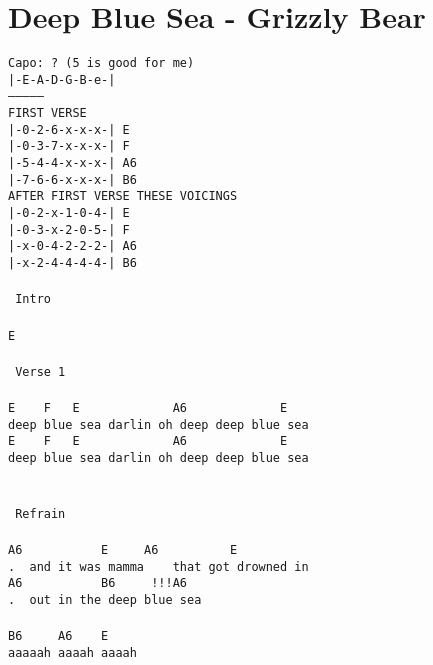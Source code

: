 \newpage
\section{Deep Blue Sea - Grizzly Bear}
\label{Deep Blue Sea - Grizzly Bear}
\texttt{Capo: ? (5 is good for me)\\
|-E-A-D-G-B-e-|\\
---------------\\
FIRST VERSE\\
|-0-2-6-x-x-x-|\ E\\
|-0-3-7-x-x-x-|\ F\\
|-5-4-4-x-x-x-|\ A6\\
|-7-6-6-x-x-x-|\ B6\\
AFTER FIRST VERSE THESE VOICINGS\\
|-0-2-x-1-0-4-|\ E\\
|-0-3-x-2-0-5-|\ F\\
|-x-0-4-2-2-2-|\ A6\\
|-x-2-4-4-4-4-|\ B6\\
\\
\lbrack\ Intro\rbrack\\
\\
E\\
\\
\lbrack\ Verse\ 1\rbrack\\
\\
E\ \ \ \ F\ \ \ E\ \ \ \ \ \ \ \ \ \ \ \ \ A6\ \ \ \ \ \ \ \ \ \ \ \ \ E\\
deep\ blue\ sea\ darlin\ oh\ deep\ deep\ blue\ sea\\
E\ \ \ \ F\ \ \ E\ \ \ \ \ \ \ \ \ \ \ \ \ A6\ \ \ \ \ \ \ \ \ \ \ \ \ E\\
deep\ blue\ sea\ darlin\ oh\ deep\ deep\ blue\ sea\\
\\
\\
\lbrack\ Refrain\rbrack\\
\\
A6\ \ \ \ \ \ \ \ \ \ \ E\ \ \ \ \ A6\ \ \ \ \ \ \ \ \ \ E\\
.\ \ and\ it\ was\ mamma\ \ \ \ that\ got\ drowned\ in\\
A6\ \ \ \ \ \ \ \ \ \ \ B6\ \ \ \ \ !!!A6\\
.\ \ out\ in\ the\ deep\ blue\ sea\\
\\
B6\ \ \ \ \ A6\ \ \ \ E\\
aaaaah\ aaaah\ aaaah\\
\\
\\
}
